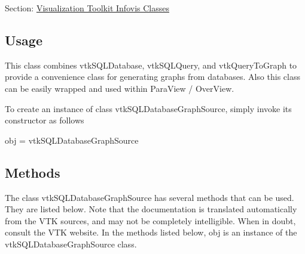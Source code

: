 Section\-: \hyperlink{sec_vtkinfovis}{Visualization Toolkit Infovis Classes} \hypertarget{vtkwidgets_vtkxyplotwidget_Usage}{}\subsection{Usage}\label{vtkwidgets_vtkxyplotwidget_Usage}
This class combines vtk\-S\-Q\-L\-Database, vtk\-S\-Q\-L\-Query, and vtk\-Query\-To\-Graph to provide a convenience class for generating graphs from databases. Also this class can be easily wrapped and used within Para\-View / Over\-View.

To create an instance of class vtk\-S\-Q\-L\-Database\-Graph\-Source, simply invoke its constructor as follows \begin{DoxyVerb}  obj = vtkSQLDatabaseGraphSource
\end{DoxyVerb}
 \hypertarget{vtkwidgets_vtkxyplotwidget_Methods}{}\subsection{Methods}\label{vtkwidgets_vtkxyplotwidget_Methods}
The class vtk\-S\-Q\-L\-Database\-Graph\-Source has several methods that can be used. They are listed below. Note that the documentation is translated automatically from the V\-T\-K sources, and may not be completely intelligible. When in doubt, consult the V\-T\-K website. In the methods listed below, {\ttfamily obj} is an instance of the vtk\-S\-Q\-L\-Database\-Graph\-Source class. 
